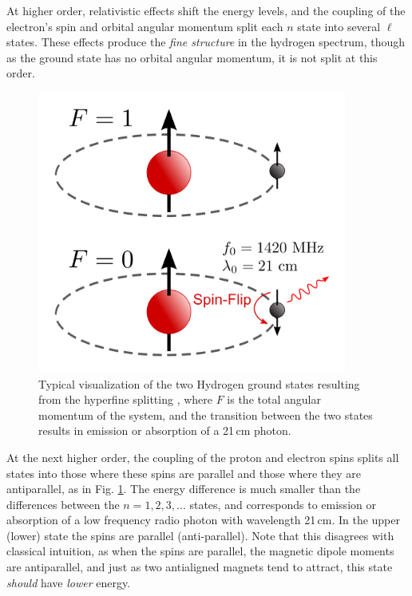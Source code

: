 At higher order, relativistic effects shift the energy levels, and the coupling of the electron's spin and orbital angular momentum split each $n$ state into several $\ell$ states. These effects produce the \textit{fine structure} in the hydrogen spectrum, though as the ground state has no orbital angular momentum, it is not split at this order. 

\begin{figure}
	\centering
	\includegraphics[width=4in]{chap0_intro/500px-Hydrogen-SpinFlip.png}
	\caption[Diagram of the two Hydrogen ground states resulting from hyperfine splitting.]{Typical visualization of the two Hydrogen ground states resulting from the hyperfine splitting \citep{HydrogenSpinFlipGraphic}, where $F$ is the total angular momentum of the system, and the transition between the two states results in emission or absorption of a 21\,cm photon.}
	\label{fig:HydrogenSpinFlipGraphic}
\end{figure}

At the next higher order, the coupling of the proton and electron spins splits all states into those where these spins are parallel and those where they are antiparallel, as in Fig. \ref{fig:HydrogenSpinFlipGraphic}. The energy difference is much smaller than the differences between the $n=1,2,3,...$ states, and corresponds to emission or absorption of a low frequency radio photon with wavelength 21\,cm. In the upper (lower) state the spins are parallel (anti-parallel). Note that this disagrees with classical intuition, as when the spins are parallel, the magnetic dipole moments are antiparallel, and just as two antialigned magnets tend to attract, this state \textit{should} have \textit{lower} energy. 

